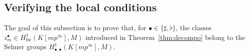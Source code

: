 \documentclass{amsart}
\numberwithin{equation}{section}
\newtheorem{lemma}[theorem]{Lemma}
\newcommand{\bb}{\mathbb}
\newcommand{\Iw}{\mathrm{Iw}}
\begin{document}
\subsection{Verifying the local conditions} 
\label{subsec_5_2_2025_11_02_1128}
The goal of this subsection is to prove that, for $\bullet\in\lbrace \sharp,\flat\rbrace$,
the classes $z_m^\bullet\in H^1_{\Iw}(K[mp^\infty],M)$ introduced in Theorem~\ref{thm:decompo} belong to the Selmer groups $H^{1}_{\bullet,\bullet}(K[mp^\infty],M)$.

\end{document}
